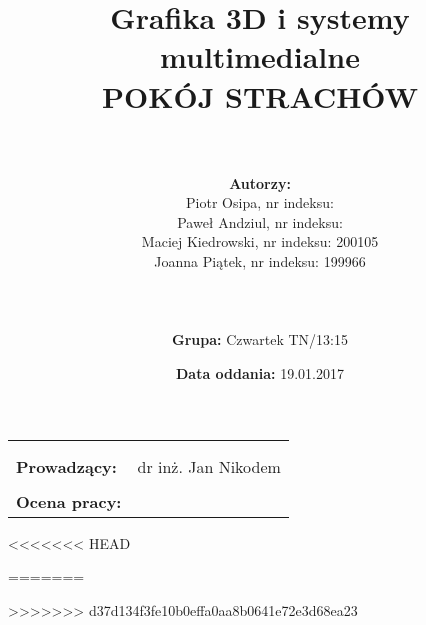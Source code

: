 \documentclass{article}
\title{Grafika 3D i systemy multimedialne\\
	\vspace{5mm}
	\textbf{POKÓJ STRACHÓW}}
\author{\\
	\\\textbf{Autorzy:}
	\\Piotr Osipa, nr indeksu:
	\\Paweł Andziul, nr indeksu: 
	\\Maciej Kiedrowski, nr indeksu: 200105
	\\Joanna Piątek, nr indeksu: 199966
	\\\\
	\\
	\\\textbf{Grupa:} Czwartek TN/13:15}
\date{\textbf{Data oddania:} 19.01.2017}
\begin{document}
\maketitle %

\begin{center}
\begin{tabular}{l r}
\\\\\\
\textbf{Prowadzący:} & dr inż. Jan Nikodem \\
\\\textbf{Ocena pracy:} &  %
\end{tabular}
\end{center}
 
\newpage
\tableofcontents 	%
\newpage

<<<<<<< HEAD




=======

\newpage

>>>>>>> d37d134f3fe10b0effa0aa8b0641e72e3d68ea23


\end{document}
